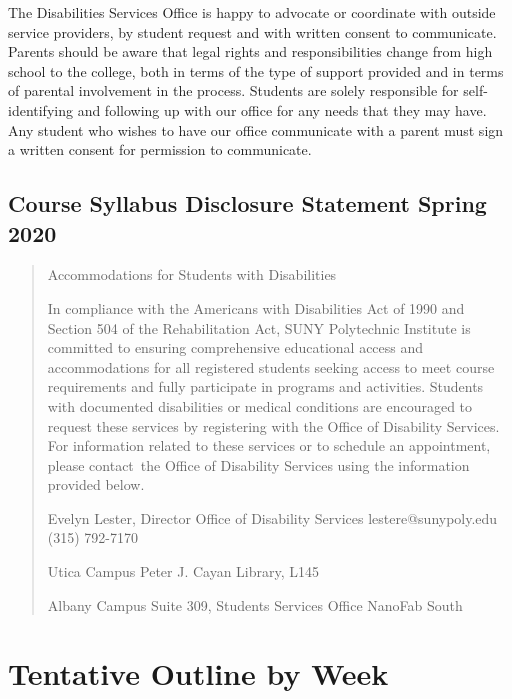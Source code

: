 \documentclass[11pt]{article}
\begin{document}
The Disabilities Services Office is happy to advocate or coordinate with outside service providers, by student request and with written consent to communicate. Parents should be aware that legal rights and responsibilities change from high school to the college, both in terms of the type of support provided and in terms of parental involvement in the process. Students are solely responsible for self-identifying and following up with our office for any needs that they may have. Any student who wishes to have our office communicate with a parent must sign a written consent for permission to communicate.

\subsection{Course Syllabus Disclosure Statement Spring 2020}
\label{sec:org34bbec6}

\begin{quote}
Accommodations for Students with Disabilities

In compliance with the Americans with Disabilities Act of 1990 and Section 504 of the Rehabilitation Act, SUNY Polytechnic Institute is committed to ensuring comprehensive educational access and accommodations for all registered students seeking access to meet course requirements and fully participate in programs and activities.  Students with documented disabilities or medical conditions are encouraged to request these services by registering with the Office of Disability Services.  For information related to these services or to schedule an appointment, please contact the Office of Disability Services using the information provided below.

Evelyn Lester, Director
Office of Disability Services
lestere@sunypoly.edu
(315) 792-7170

Utica Campus
Peter J. Cayan Library, L145

Albany Campus
Suite 309, Students Services Office
NanoFab South
\end{quote}

\section{Tentative Outline by Week}
\label{sec:org0f1c385}
\end{document}
